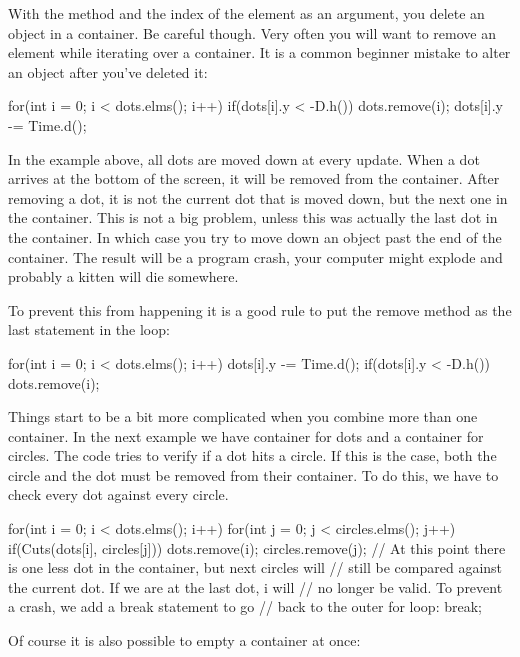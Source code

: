 With the method  and the index of the element as an argument, you delete an object in a container. Be careful though. Very often you will want to remove an element while iterating over a container. It is a common beginner mistake to alter an object after you've deleted it:

\begin{code}
for(int i = 0; i < dots.elms(); i++) {
    if(dots[i].y < -D.h()) {
        dots.remove(i);
	}
	dots[i].y -= Time.d();
}
\end{code}

In the example above, all dots are moved down at every update. When a dot arrives at the bottom of the screen, it will be removed from the container. After removing a dot, it is not the current dot that is moved down, but the next one in the container. This is not a big problem, unless this was actually the last dot in the container. In which case you try to move down an object past the end of the container. The result will be a program crash, your computer might explode and probably a kitten will die somewhere.

To prevent this from happening it is a good rule to put the remove method as the last statement in the loop:

\begin{code}
for(int i = 0; i < dots.elms(); i++) {
	dots[i].y -= Time.d();
  if(dots[i].y < -D.h()) dots.remove(i);
}
\end{code}

Things start to be a bit more complicated when you combine more than one container. In the next example we have container for dots and a container for circles. The code tries to verify if a dot hits a circle. If this is the case, both the circle and the dot must be removed from their container. To do this, we have to check every dot against every circle.

\begin{code}
for(int i = 0; i < dots.elms(); i++) {
	for(int j = 0; j < circles.elms(); j++) {
	    if(Cuts(dots[i], circles[j])) {
		    dots.remove(i);
		    circles.remove(j);
		    // At this point there is one less dot in the container, but next circles will
		    // still be compared against the current dot. If we are at the last dot, i will
		    // no longer be valid. To prevent a crash, we add a break statement to go
		    // back to the outer for loop:
			break;
		}		
	}
}
\end{code}

Of course it is also possible to empty a container at once:

